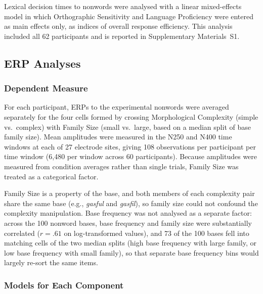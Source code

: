 Lexical decision times to nonwords were analysed with a linear mixed-effects model in which Orthographic Sensitivity and Language Proficiency were entered as main effects only, as indices of overall response efficiency. This analysis included all 62 participants and is reported in Supplementary Materials~S1.

\subsection{ERP Analyses}

\subsubsection{Dependent Measure}

For each participant, ERPs to the experimental nonwords were averaged separately for the four cells formed by crossing Morphological Complexity (simple vs.\ complex) with Family Size (small vs.\ large, based on a median split of base family size). %
Mean amplitudes were measured in the N250 and N400 time windows at each of 27 electrode sites, giving 108 observations per participant per time window (6,480 per window across 60 participants). %
Because amplitudes were measured from condition averages rather than single trials, Family Size was treated as a categorical factor.

Family Size is a property of the base, and both members of each complexity pair share the same base (e.g., \textit{gasful} and \textit{gasfil}), so family size could not confound the complexity manipulation. Base frequency was not analysed as a separate factor: across the 100 nonword bases, base frequency and family size were substantially correlated ($r = .61$ on log-transformed values), and 73 of the 100 bases fell into matching cells of the two median splits (high base frequency with large family, or low base frequency with small family), so that separate base frequency bins would largely re-sort the same items.

\subsubsection{Models for Each Component}


